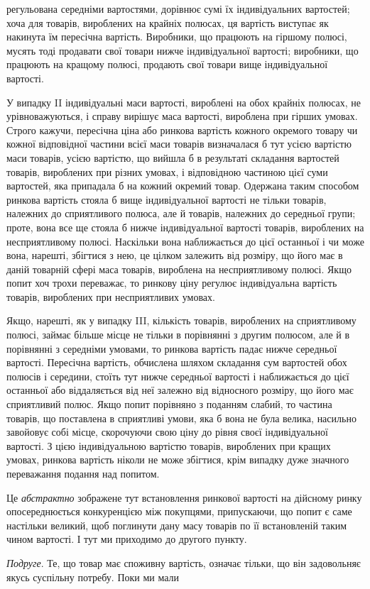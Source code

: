 \parcont{}  %
регульована середніми вартостями, дорівнює сумі їх індивідуальних вартостей; хоча для товарів,
вироблених на крайніх полюсах, ця вартість виступає як накинута їм пересічна вартість. Виробники, що
працюють на гіршому полюсі, мусять тоді продавати свої товари нижче індивідуальної вартості;
виробники,
що працюють на кращому полюсі, продають свої товари вище
індивідуальної вартості.

У випадку II індивідуальні маси вартості, вироблені на обох
крайніх полюсах, не урівноважуються, і справу вирішує маса
вартості, вироблена при гірших умовах. Строго кажучи, пересічна ціна або ринкова вартість кожного
окремого товару чи
кожної відповідної частини всієї маси товарів визначалася б тут
усією вартістю маси товарів, усією вартістю, що вийшла б
в результаті складання вартостей товарів, вироблених при різних умовах, і відповідною частиною цієї
суми вартостей, яка
припадала б на кожний окремий товар. Одержана таким способом ринкова вартість стояла б вище
індивідуальної вартості
не тільки товарів, належних до сприятливого полюса, але й товарів, належних до середньої групи;
проте, вона все ще стояла б
нижче індивідуальної вартості товарів, вироблених на несприятливому полюсі. Наскільки вона
наближається до цієї останньої
і чи може вона, нарешті, збігтися з нею, це цілком залежить від
розміру, що його має в даній товарній сфері маса товарів,
вироблена на несприятливому полюсі. Якщо попит хоч трохи
переважає, то ринкову ціну регулює індивідуальна вартість товарів, вироблених при несприятливих
умовах.

Якщо, нарешті, як у випадку III, кількість товарів, вироблених на сприятливому полюсі, займає більше
місце не тільки
в порівнянні з другим полюсом, але й в порівнянні з середніми
умовами, то ринкова вартість падає нижче середньої вартості.
Пересічна вартість, обчислена шляхом складання сум вартостей
обох полюсів і середини, стоїть тут нижче середньої вартості
і наближається до цієї останньої або віддаляється від неї
залежно від відносного розміру, що його має сприятливий полюс.
Якщо попит порівняно з поданням слабий, то частина товарів,
що поставлена в сприятливі умови, яка б вона не була велика,
насильно завойовує собі місце, скорочуючи свою ціну до рівня
своєї індивідуальної вартості. З цією індивідуальною вартістю
товарів, вироблених при кращих умовах, ринкова вартість ніколи
не може збігтися, крім випадку дуже значного переважання подання над попитом.

Це \emph{абстрактно} зображене тут встановлення ринкової вартості на дійсному ринку опосереднюється
конкуренцією між
покупцями, припускаючи, що попит є саме настільки великий,
щоб поглинути дану масу товарів по її встановленій таким
чином вартості. І тут ми приходимо до другого пункту.

\emph{Подруге}. Те, що товар має споживну вартість, означає тільки,
що він задовольняє якусь суспільну потребу. Поки ми мали
\parbreak{}  %
